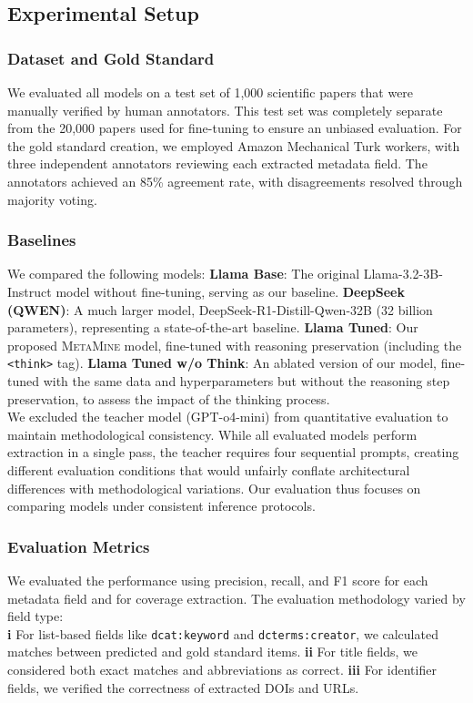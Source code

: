 \documentclass[runningheads]{llncs}
\begin{document}
\subsection{Experimental Setup}
\subsubsection{Dataset and Gold Standard}
We evaluated all models on a test set of 1,000 scientific papers that were manually verified by human annotators. This test set was completely separate from the 20,000 papers used for fine-tuning to ensure an unbiased evaluation. For the gold standard creation, we employed Amazon Mechanical Turk workers, with three independent annotators reviewing each extracted metadata field. The annotators achieved an 85\% agreement rate, with disagreements resolved through majority voting.
\subsubsection{Baselines}
We compared the following models:
     \textbf{Llama Base}: The original Llama-3.2-3B-Instruct model without fine-tuning, serving as our baseline.
     \textbf{DeepSeek (QWEN)}: A much larger model, DeepSeek-R1-Distill-Qwen-32B (32 billion parameters), representing a state-of-the-art baseline.
     \textbf{Llama Tuned}: Our proposed \textsc{MetaMine} model, fine-tuned with reasoning preservation (including the \texttt{<think>} tag).
     \textbf{Llama Tuned w/o Think}: An ablated version of our model, fine-tuned with the same data and hyperparameters but without the reasoning step preservation, to assess the impact of the thinking process.
\\
\noindent
We excluded the teacher model (GPT-o4-mini) from quantitative evaluation to maintain methodological consistency. While all evaluated models perform extraction in a single pass, the teacher requires four sequential prompts, creating different evaluation conditions that would unfairly conflate architectural differences with methodological variations. Our evaluation thus focuses on comparing models under consistent inference protocols.
\subsubsection{Evaluation Metrics}
We evaluated the performance using precision, recall, and F1 score for each metadata field and for coverage extraction. The evaluation methodology varied by field type:
\\
\noindent 
\textbf{i}  For list-based fields like \texttt{dcat:keyword} and \texttt{dcterms:creator}, we calculated matches between predicted and gold standard items.
\textbf{ii} For title fields, we considered both exact matches and abbreviations as correct.
\textbf{iii} For identifier fields, we verified the correctness of extracted DOIs and URLs.
\end{document}
